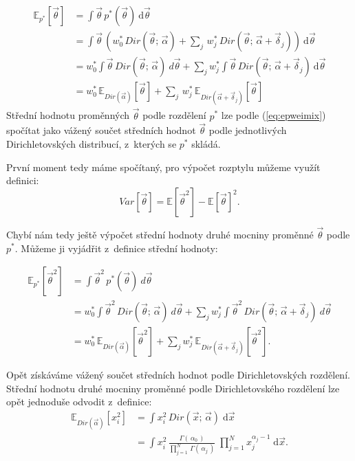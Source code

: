 \begin{align}
\mathbb{E}_{p^*}[\vec\theta] &= \int \vec\theta \, p^*(\vec\theta) ~ \mathrm{d}\vec\theta
\\
&= \int \vec\theta \, (
	w_0^* \, Dir(\vec{\theta};\, \vec{\alpha}) +
	\sum_j \, w^*_j \,
        	Dir(\vec{\theta};\, \vec{\alpha} + \vec{\delta}_j)
    ) ~ \mathrm{d}\vec\theta
\\
&= w_0^* \int \vec\theta \, Dir(\vec{\theta};\, \vec{\alpha}) ~ d\vec\theta +
	\sum_j w_j^* \int \vec\theta \, Dir(\vec{\theta};\, \vec{\alpha} + \vec{\delta}_j)
    ~ \mathrm{d}\vec\theta
\\
&= w_0^* \, \mathbb{E}_{Dir(\vec\alpha)}[\vec\theta] +
	\sum_j \, w_j^* \, \mathbb{E}_{Dir(\vec\alpha + \vec{\delta}_j)}[\vec\theta]
\label{eq:epweimix}
\end{align}
Střední hodnotu proměnných $\vec\theta$ podle rozdělení $p^*$ lze podle (\ref{eq:epweimix}) spočítat
jako vážený součet středních hodnot $\vec\theta$ podle jednotlivých
Dirichletovských distribucí, z~kterých se $p^*$ skládá.

První moment tedy máme spočítaný, pro výpočet rozptylu můžeme využít
definici:
\begin{equation}
	Var[\vec{\theta}] = \mathbb{E}[\vec{\theta}^2] - \mathbb{E}[\vec\theta]^2.
\end{equation}

Chybí nám tedy ještě výpočet střední hodnoty druhé mocniny proměnné
$\vec\theta$ podle $p^*$. Můžeme ji vyjádřit z~definice střední hodnoty:

\begin{align}
\mathbb{E}_{p^*}[\vec\theta^2] &= \int \vec\theta^2 \, p^*(\vec\theta) ~ d\vec\theta
\\
&= w_0^* \int \vec\theta^2 \, Dir(\vec{\theta};\, \vec{\alpha}) ~ d\vec\theta +
	\sum_j w_j^* \int \vec\theta^2 \, Dir(\vec{\theta};\, \vec{\alpha} + \vec{\delta}_j)
	 ~ d\vec\theta
\\
&= w_0^* \, \mathbb{E}_{Dir(\vec\alpha)}[\vec\theta^2] +
	\sum_j w_j^* \, \mathbb{E}_{Dir(\vec\alpha + \vec{\delta}_j)}[\vec\theta^2].
\label{eq:epweimix2}
\end{align}

Opět získáváme vážený součet středních hodnot podle Dirichletovských rozdělení.
Střední hodnotu druhé mocniny proměnné podle Dirichletovského rozdělení
lze opět jednoduše odvodit z~definice:
\begin{align}
\mathbb{E}_{Dir(\vec\alpha)}[x_i^2] &=
	\int x_i^2 \, Dir(\vec x; \, \vec\alpha) \; \mathrm{d}\vec x
\\
&=
	\int x_i^2 \, \frac{\Gamma(\,\alpha_0\,)}
			   {\prod_{j=1}^N \, \Gamma(\,\alpha_j\,)} \;
		\prod_{j=1}^N x_j^{\alpha_j - 1} \; \mathrm{d}\vec x.
\end{align}

